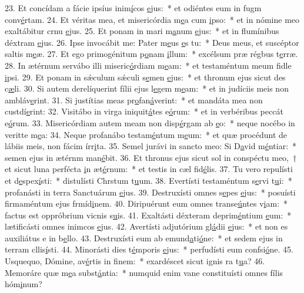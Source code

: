 23. Et concídam a fácie ipsíus inim\uline{í}cos \uline{e}jus:~* et odiéntes eum in fugm conv\uline{é}rtam.
24. Et véritas mea, et misericórdia m\uline{e}a cum \uline{i}pso:~* et in nómine meo exaltábitur crnu \uline{e}jus.
25. Et ponam in mari m\uline{a}num \uline{e}jus:~* et in flumínibus déxtram \uline{e}jus.
26. Ipse invocábit me: Pater m\uline{e}us \uline{e}s tu:~* Deus meus, et suscéptor saltis m\uline{e}æ.
27. Et ego primogénitum p\uline{o}nam \uline{i}llum:~* excélsum præ régbus t\uline{e}rræ.
28. In ætérnum servábo illi miseric\uline{ó}rdiam m\uline{e}am:~* et testaméntum meum fidle \uline{i}psi.
29. Et ponam in sǽculum sǽculi s\uline{e}men \uline{e}jus:~* et thronum ejus sicut des c\uline{æ}li.
30. Si autem derelíquerint fílii ejus l\uline{e}gem m\uline{e}am:~* et in judíciis meis non ambláv\uline{e}rint.
31. Si justítias meas pr\uline{o}fan\uline{á}verint:~* et mandáta mea non custdí\uline{e}rint:
32. Visitábo in virga iniquit\uline{á}tes e\uline{ó}rum:~* et in verbéribus peccát e\uline{ó}rum.
33. Misericórdiam autem meam non disp\uline{é}rgam ab \uline{e}o:~* neque nocébo in veritte m\uline{e}a:
34. Neque profanábo testam\uline{é}ntum m\uline{e}um:~* et quæ procédunt de lábiis meis, non fácim írr\uline{i}ta.
35. Semel jurávi in sancto meo: Si D\uline{a}vid m\uline{é}ntiar:~* semen ejus in ætérnm man\uline{é}bit.
36. Et thronus ejus sicut sol in conspéctu meo,~† et sicut luna perfécta \uline{i}n æt\uline{é}rnum:~* et testis in cæl fid\uline{é}lis.
37. Tu vero repulísti et d\uline{e}spex\uline{í}sti:~* distulísti Chrstum t\uline{u}um.
38. Evertísti testaméntum s\uline{e}rvi t\uline{u}i:~* profanásti in terra Sanctuárum \uline{e}jus.
39. Destruxísti omnes s\uline{e}pes \uline{e}jus:~* posuísti firmaméntum ejus frmíd\uline{i}nem.
40. Diripuérunt eum omnes transe\uline{ú}ntes v\uline{i}am:~* factus est oppróbrium vicnis s\uline{u}is.
41. Exaltásti déxteram deprim\uline{é}ntium \uline{e}um:~* lætificásti omnes inimcos \uline{e}jus.
42. Avertísti adjutórium gl\uline{á}dii \uline{e}jus:~* et non es auxiliátus e in b\uline{e}llo.
43. Destruxísti eum ab emund\uline{a}ti\uline{ó}ne:~* et sedem ejus in terram cllis\uline{í}sti.
44. Minorásti dies t\uline{é}mporis \uline{e}jus:~* perfudísti eum confsi\uline{ó}ne.
45. Usquequo, Dómine, av\uline{é}rtis in f\uline{i}nem:~* exardéscet sicut ignis ra t\uline{u}a?
46. Memoráre quæ m\uline{e}a subst\uline{á}ntia:~* numquid enim vane constituísti omnes fílis hóm\uline{i}num?
